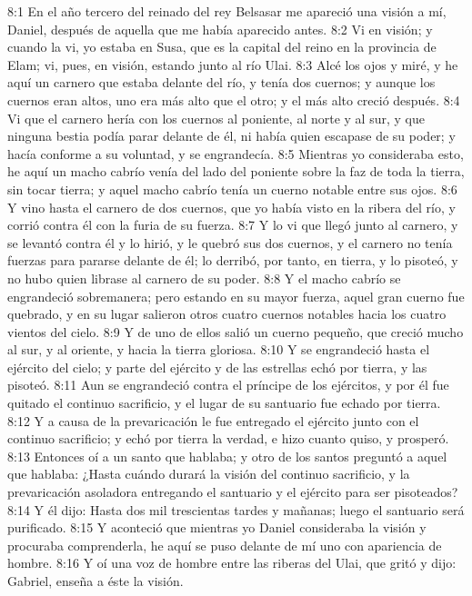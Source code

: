 8:1 En el año tercero del reinado del rey Belsasar me apareció una visión a mí, Daniel, después de aquella que me había aparecido antes. 
8:2 Vi en visión; y cuando la vi, yo estaba en Susa, que es la capital del reino en la provincia de Elam; vi, pues, en visión, estando junto al río Ulai. 
8:3 Alcé los ojos y miré, y he aquí un carnero que estaba delante del río, y tenía dos cuernos; y aunque los cuernos eran altos, uno era más alto que el otro; y el más alto creció después. 
8:4 Vi que el carnero hería con los cuernos al poniente, al norte y al sur, y que ninguna bestia podía parar delante de él, ni había quien escapase de su poder; y hacía conforme a su voluntad, y se engrandecía. 
8:5 Mientras yo consideraba esto, he aquí un macho cabrío venía del lado del poniente sobre la faz de toda la tierra, sin tocar tierra; y aquel macho cabrío tenía un cuerno notable entre sus ojos. 
8:6 Y vino hasta el carnero de dos cuernos, que yo había visto en la ribera del río, y corrió contra él con la furia de su fuerza. 
8:7 Y lo vi que llegó junto al carnero, y se levantó contra él y lo hirió, y le quebró sus dos cuernos, y el carnero no tenía fuerzas para pararse delante de él; lo derribó, por tanto, en tierra, y lo pisoteó, y no hubo quien librase al carnero de su poder. 
8:8 Y el macho cabrío se engrandeció sobremanera; pero estando en su mayor fuerza, aquel gran cuerno fue quebrado, y en su lugar salieron otros cuatro cuernos notables hacia los cuatro vientos del cielo. 
8:9 Y de uno de ellos salió un cuerno pequeño, que creció mucho al sur, y al oriente, y hacia la tierra gloriosa. 
8:10 Y se engrandeció hasta el ejército del cielo; y parte del ejército y de las estrellas echó por tierra,  y las pisoteó. 
8:11 Aun se engrandeció contra el príncipe de los ejércitos, y por él fue quitado el continuo sacrificio, y el lugar de su santuario fue echado por tierra. 
8:12 Y a causa de la prevaricación le fue entregado el ejército junto con el continuo sacrificio; y echó por tierra la verdad, e hizo cuanto quiso, y prosperó. 
8:13 Entonces oí a un santo que hablaba; y otro de los santos preguntó a aquel que hablaba: ¿Hasta cuándo durará la visión del continuo sacrificio, y la prevaricación asoladora entregando el santuario y el ejército para ser pisoteados? 
8:14 Y él dijo: Hasta dos mil trescientas tardes y mañanas; luego el santuario será purificado. 
8:15 Y aconteció que mientras yo Daniel consideraba la visión y procuraba comprenderla, he aquí se puso delante de mí uno con apariencia de hombre. 
8:16 Y oí una voz de hombre entre las riberas del Ulai, que gritó y dijo: Gabriel, enseña a éste la visión. 
